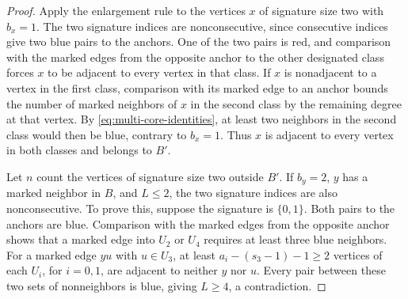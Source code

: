 \documentclass[preprint,11pt,numbers]{elsarticle-arxiv}
\numberwithin{equation}{section}
\theoremstyle{definition}
\begin{document}
\begin{proof}
Apply the enlargement rule to the vertices $x$ of signature size
two with $b_x=1$. The two signature indices are nonconsecutive,
since consecutive indices give two blue pairs to the anchors.
One of the two pairs is red, and comparison with the marked
edges from the opposite anchor to the other designated class
forces $x$ to be adjacent to every vertex in that class.
If $x$ is nonadjacent to a vertex in the first class, comparison
with its marked edge to an anchor bounds the number of marked
neighbors of $x$ in the second class by the remaining degree
at that vertex. By \eqref{eq:multi-core-identities}, at least
two neighbors in the second class would then be blue, contrary
to $b_x=1$. Thus $x$ is adjacent to every vertex in both classes
and belongs to $B'$.

Let $n$ count the vertices of signature size two outside $B'$.
If $b_y=2$, $y$ has a marked neighbor in $B$, and $L\le2$,
the two signature indices are also nonconsecutive. To prove
this, suppose the signature is $\{0,1\}$. Both pairs to the
anchors are blue. Comparison with the marked edges from the
opposite anchor shows that a marked edge into $U_2$ or $U_4$
requires at least three blue neighbors. For a marked edge $yu$
with $u\in U_3$, at least $a_i-(s_3-1)-1\ge2$ vertices of
each $U_i$, for $i=0,1$, are adjacent to neither $y$ nor $u$.
Every pair between these two sets of nonneighbors is blue,
giving $L\ge4$, a contradiction.


\end{proof}
\end{document}
